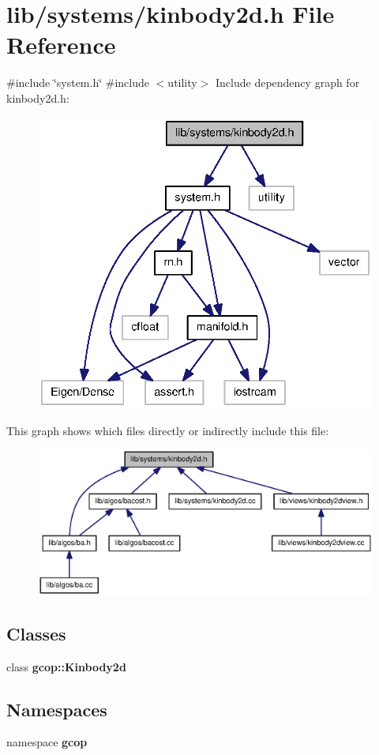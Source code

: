 \section{lib/systems/kinbody2d.h \-File \-Reference}
\label{kinbody2d_8h}
{\ttfamily \#include \char`\"{}system.\-h\char`\"{}}\*
{\ttfamily \#include $<$utility$>$}\*
\-Include dependency graph for kinbody2d.\-h\-:\nopagebreak
\begin{figure}[H]
\begin{center}
\leavevmode
\includegraphics[width=336pt]{kinbody2d_8h__incl}
\end{center}
\end{figure}
\-This graph shows which files directly or indirectly include this file\-:\nopagebreak
\begin{figure}[H]
\begin{center}
\leavevmode
\includegraphics[width=350pt]{kinbody2d_8h__dep__incl}
\end{center}
\end{figure}
\subsection*{\-Classes}
\begin{DoxyCompactItemize}
\item 
class {\bf gcop\-::\-Kinbody2d}
\end{DoxyCompactItemize}
\subsection*{\-Namespaces}
\begin{DoxyCompactItemize}
\item 
namespace {\bf gcop}
\end{DoxyCompactItemize}
